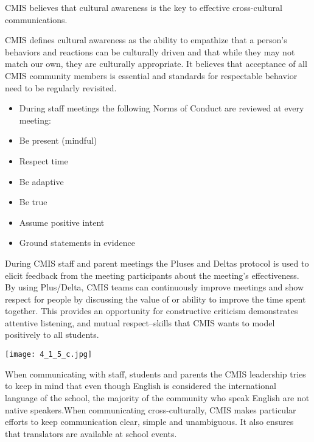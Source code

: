 

\begin{findings}
CMIS believes that cultural awareness is the key to effective cross-cultural communications. 

CMIS defines cultural awareness as the ability to empathize that a person's behaviors and reactions can be culturally driven and that while they may not match our own, they are culturally appropriate. It believes that acceptance of all CMIS community members is essential and standards for respectable behavior need to be regularly revisited. 


\begin{itemize}
\item During staff meetings the following Norms of Conduct are reviewed at every meeting:
\item Be present (mindful)
\item Respect time
\item Be adaptive
\item Be true
\item Assume positive intent
\item Ground statements in evidence
\end{itemize}

During CMIS staff and parent meetings the Pluses and Deltas protocol is used to elicit feedback from the meeting participants about the meeting's effectiveness. By using Plus/Delta, CMIS teams can continuously improve meetings and show respect for people by discussing the value of or ability to improve the time spent together. This provides an opportunity for constructive criticism demonstrates attentive listening, and mutual respect--skills that CMIS wants to model positively to all  students.

{\centering\texttt{[image: 4\_1\_5\_c.jpg]}}

When communicating with staff, students and parents the CMIS leadership tries to keep in mind that even though English is considered the international language of the school, the majority of the community who speak English are not native speakers.When communicating cross-culturally, CMIS makes particular efforts to keep communication clear, simple and unambiguous. It also ensures that translators are available at school events.


\end{findings}
